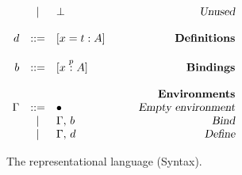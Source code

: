 \begin{figure}
\begin{center}
\begin{math}
\begin{array}{rclr}
&|&
\bot
& \qquad\textsl{Unused}
\\
\\
d 
&::=& 
[x = t : A] 
& \qquad\textsl{\bf Definitions}
\\
\\
b
&::=& [x \stackrel{p}{:} A]
& \qquad\textsl{\bf Bindings}
\\
\\
&&&\qquad\textsl{\bf Environments}\\
\Gamma 

&::=&
\bullet
& \qquad\textsl{Empty environment}
\\

&|&
\Gamma,\, b
& \qquad\textsl{Bind}
\\
&|&
\Gamma,\, d
& \qquad\textsl{Define}
\\

\end{array}
\end{math}
\end{center}

\caption{The {\system} representational language (Syntax).}
\label{fig:syntax-s2}
\end{figure}
